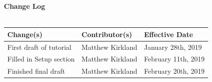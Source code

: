 \documentclass[12pt]{extarticle}
\begin{document}
\pagebreak
\textbf{Change Log}\\\\

\begin{tabular}{| C{5cm} | C{5cm} | C{5cm} |}
\hline
\textbf{Change(s)} & \textbf{Contributor(s)} & \textbf{Effective Date} \\
\hline
First draft of tutorial & Matthew Kirkland & January 28th, 2019 \\
\hline
Filled in Setup section & Matthew Kirkland & February 11th, 2019 \\
\hline
Finished final draft & Matthew Kirkland & February 20th, 2019 \\
\hline
\end{tabular}

\pagebreak


{}
\end{document}
